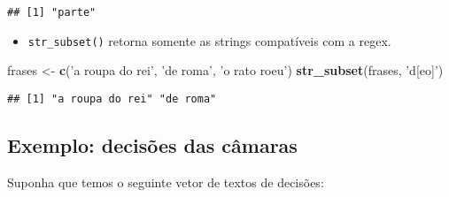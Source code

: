 \documentclass[]{book}
\newenvironment{Shaded}{\begin{snugshade}}{\end{snugshade}}
\newcommand{\KeywordTok}[1]{\textcolor[rgb]{0.13,0.29,0.53}{\textbf{{#1}}}}
\newcommand{\DataTypeTok}[1]{\textcolor[rgb]{0.13,0.29,0.53}{{#1}}}
\newcommand{\DecValTok}[1]{\textcolor[rgb]{0.00,0.00,0.81}{{#1}}}
\newcommand{\StringTok}[1]{\textcolor[rgb]{0.31,0.60,0.02}{{#1}}}
\newcommand{\CommentTok}[1]{\textcolor[rgb]{0.56,0.35,0.01}{\textit{{#1}}}}
\newcommand{\OtherTok}[1]{\textcolor[rgb]{0.56,0.35,0.01}{{#1}}}
\newcommand{\NormalTok}[1]{{#1}}
\providecommand{\tightlist}{%
  \setlength{\itemsep}{0pt}\setlength{\parskip}{0pt}}
\begin{document}
\begin{verbatim}
## [1] "parte"
\end{verbatim}

\begin{itemize}
\tightlist
\item
  \texttt{str\_subset()} retorna somente as strings compatíveis com a
  regex.
\end{itemize}

\begin{Shaded}
\begin{Highlighting}[]
\NormalTok{frases <-}\StringTok{ }\KeywordTok{c}\NormalTok{(}\StringTok{'a roupa do rei'}\NormalTok{, }\StringTok{'de roma'}\NormalTok{, }\StringTok{'o rato roeu'}\NormalTok{)}
\KeywordTok{str_subset}\NormalTok{(frases, }\StringTok{'d[eo]'}\NormalTok{)}
\end{Highlighting}
\end{Shaded}

\begin{verbatim}
## [1] "a roupa do rei" "de roma"
\end{verbatim}

\subsection{Exemplo: decisões das
câmaras}\label{exemplo-decisoes-das-camaras}

Suponha que temos o seguinte vetor de textos de decisões:

\begin{Shaded}
\end{Shaded}
\end{document}
